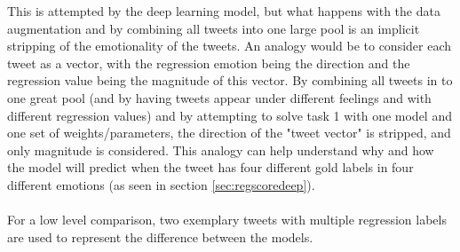 This is attempted by the deep learning model, but what happens with the data augmentation and by combining all tweets into one large pool is an implicit stripping of the emotionality of the tweets. An analogy would be to consider each tweet as a vector, with the regression emotion being the direction and the regression value being the magnitude of this vector. By combining all tweets in to one great pool (and by having tweets appear under different feelings and with different regression values) and by attempting to solve task 1 with one model and one set of weights/parameters, the direction of the "tweet vector" is stripped, and only magnitude is considered. This analogy can help understand why and how the model will predict when the tweet has four different gold labels in four different emotions (as seen in section \ref{sec:regscoredeep}).\\
\\
For a low level comparison, two exemplary tweets with multiple regression labels are used to represent the difference between the models.
